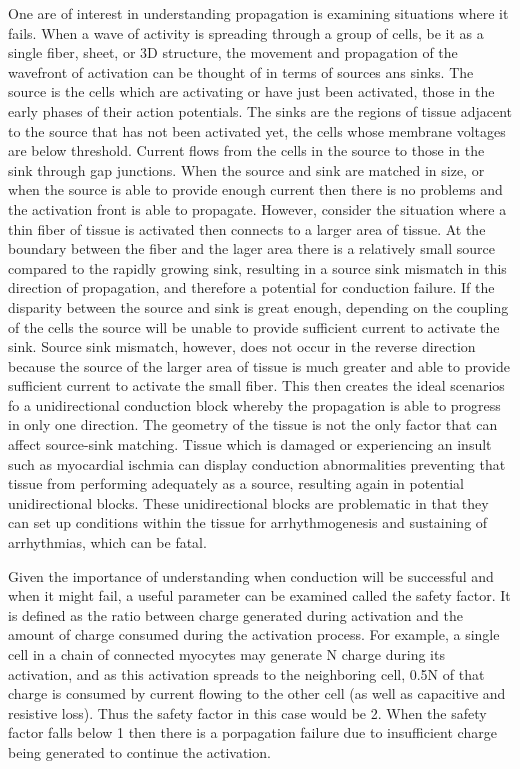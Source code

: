 \documentclass[12pt]{article}
\begin{document}
One are of interest in understanding propagation is examining situations where it fails. When a wave of activity is spreading through a group of cells, be it as a single fiber, sheet, or 3D structure, the movement and propagation of the wavefront of activation can be thought of in terms of sources ans sinks. The source is the cells which are activating or have just been activated, those in the early phases of their action potentials. The sinks are the regions of tissue adjacent to the source that has not been activated yet, the cells whose membrane voltages are below threshold. Current flows from the cells in the source to those in the sink through gap junctions. When the source and sink are matched in size, or when the source is able to provide enough current then there is no problems and the activation front is able to propagate. However, consider the situation where a thin fiber of tissue is activated then connects to a larger area of tissue. At the boundary between the fiber and the lager area there is a relatively small source compared to the rapidly growing sink, resulting in a source sink mismatch in this direction of propagation, and therefore a potential for conduction failure. If the disparity between the source and sink is great enough, depending on the coupling of the cells the source will be unable to provide sufficient current to activate the sink. Source sink mismatch, however, does not occur in the reverse direction because the source of the larger area of tissue is much greater and able to provide sufficient current to activate the small fiber. This then creates the ideal scenarios fo a unidirectional conduction block whereby the propagation is able to progress in only one direction. The geometry of the tissue is not the only factor that can affect source-sink matching. Tissue which is damaged or experiencing an insult such as myocardial ischmia can display conduction abnormalities preventing that tissue from performing adequately as a source, resulting again in potential unidirectional blocks. These unidirectional blocks are problematic in that they can set up conditions within the tissue for arrhythmogenesis and sustaining of arrhythmias, which can be fatal.

Given the importance of understanding when conduction will be successful and when it might fail, a useful parameter can be examined called the safety factor. It is defined as the ratio between charge generated during activation and the amount of charge consumed during the activation process. For example, a single cell in a chain of connected myocytes may generate N charge during its activation, and as this activation spreads to the neighboring cell, 0.5N of that charge is consumed by current flowing to the other cell (as well as capacitive and resistive loss). Thus the safety factor in this case would be 2. When the safety factor falls below 1 then there is a porpagation failure due to insufficient charge being generated to continue the activation.
\end{document}

